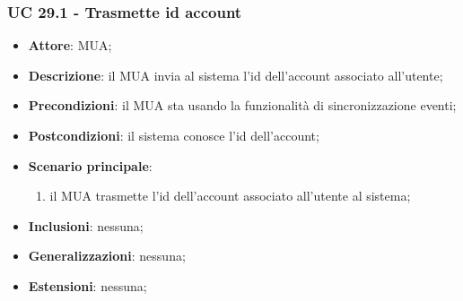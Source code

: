     \subsubsection{UC 29.1 - Trasmette id account} \label{sec:UC29.1}
    \begin{itemize}
        \item \textbf{Attore}: MUA;
        \item \textbf{Descrizione}: il MUA invia al sistema l'id dell'account associato all'utente;
        \item \textbf{Precondizioni}: il MUA sta usando la funzionalità di sincronizzazione eventi;
        \item \textbf{Postcondizioni}: il sistema conosce l'id dell'account;
        \item \textbf{Scenario principale}:
            \begin{enumerate}
                \item il MUA trasmette l'id dell'account associato all'utente al sistema;
            \end{enumerate}
        \item \textbf{Inclusioni}: nessuna;
        \item \textbf{Generalizzazioni}: nessuna;
        \item \textbf{Estensioni}: nessuna;
    \end{itemize}


